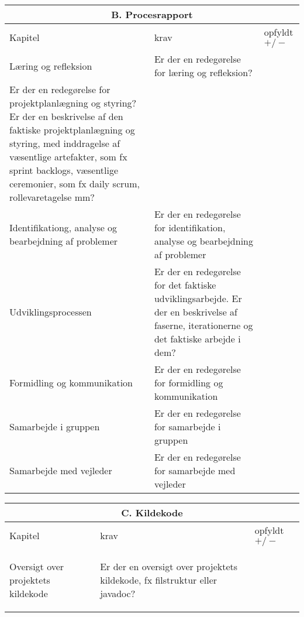 \begin{center}
\begin{longtable}{|m{3.5cm}|m{10cm}|m{2.5cm}|}
\hline
\multicolumn{3}{|c|}{B. Procesrapport} \\
\hline
Kapitel & krav & opfyldt $+/-$ \\ \hline
Læring og refleksion & Er der en redegørelse for læring og refleksion? & \\ 
\hline
Er der en redegørelse for projektplanlægning og styring? Er der en beskrivelse af den faktiske projektplanlægning og styring, med inddragelse af væsentlige artefakter, som fx sprint backlogs, væsentlige ceremonier, som fx  daily scrum, rollevaretagelse mm? & \\ 
\hline
\begin{flushleft} 
Identifikationg, analyse og bearbejdning af problemer
\end{flushleft}
& Er der en redegørelse for identifikation, analyse og bearbejdning af problemer & \\ 
\hline
Udviklingsprocessen & Er der en redegørelse for det faktiske udviklingsarbejde. Er der en beskrivelse af faserne, iterationerne og det faktiske  arbejde i dem? & \\ \hline
\begin{flushleft} 
Formidling og kommunikation
\end{flushleft}
& Er der en redegørelse for formidling og kommunikation & \\ 
\hline
\begin{flushleft} 
Samarbejde i gruppen 
\end{flushleft}
& Er der en redegørelse for samarbejde i gruppen & \\ \hline
\begin{flushleft} 
Samarbejde med vejleder
\end{flushleft}
& Er der en redegørelse for samarbejde med vejleder & \\ \hline

\end{longtable}
\end{center}

\begin{center}
\begin{longtable}{|m{3.5cm}|m{10cm}|m{2.5cm}|}
\hline
\multicolumn{3}{|c|}{C. Kildekode} \\ \hline
Kapitel & krav & opfyldt $+/-$ \\ \hline
\begin{flushleft} 
Oversigt over projektets kildekode
\end{flushleft} 
& Er der en oversigt over projektets kildekode, fx filstruktur eller javadoc? & \\ \hline
\end{longtable}
\end{center}

